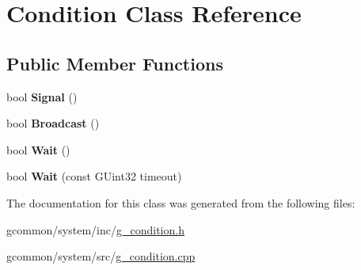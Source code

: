 \hypertarget{class_condition}{\section{Condition Class Reference}
\label{class_condition}
}
\subsection*{Public Member Functions}
\begin{DoxyCompactItemize}
\item 
\hypertarget{class_condition_a7e3d3131095df5f1f172a855f318f04f}{bool {\bfseries Signal} ()}\label{class_condition_a7e3d3131095df5f1f172a855f318f04f}

\item 
\hypertarget{class_condition_a43d4163606d08a7e62cdc4a1c17410c1}{bool {\bfseries Broadcast} ()}\label{class_condition_a43d4163606d08a7e62cdc4a1c17410c1}

\item 
\hypertarget{class_condition_a985e7117577534e449b37d7e5c258f68}{bool {\bfseries Wait} ()}\label{class_condition_a985e7117577534e449b37d7e5c258f68}

\item 
\hypertarget{class_condition_a6cc48d5c500d3ec4c88c7a4edfae3445}{bool {\bfseries Wait} (const G\-Uint32 timeout)}\label{class_condition_a6cc48d5c500d3ec4c88c7a4edfae3445}

\end{DoxyCompactItemize}


The documentation for this class was generated from the following files\-:\begin{DoxyCompactItemize}
\item 
gcommon/system/inc/\hyperlink{g__condition_8h}{g\-\_\-condition.\-h}\item 
gcommon/system/src/\hyperlink{g__condition_8cpp}{g\-\_\-condition.\-cpp}\end{DoxyCompactItemize}
